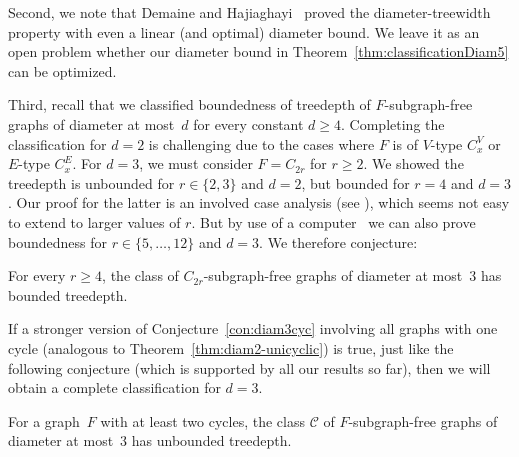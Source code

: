\documentclass[runningheads,envcountsame]{llncs}
\newcommand{\forbiddenGraph}{F}
\begin{document}
Second, we note that Demaine and Hajiaghayi~\cite{DH04} proved the diameter-treewidth property with even a linear (and optimal) diameter bound. We leave it as an open problem whether our diameter bound in Theorem~\ref{thm:classificationDiam5} can be optimized.

Third, recall that we classified boundedness of treedepth of $F$-subgraph-free graphs of diameter at most~$d$ for every constant $d\geq 4$. Completing the classification for $d=2$ is challenging due to the cases where $F$ is of $V$-type $C^V_x$ or $E$-type $C^E_x$. For $d=3$, we must consider $F=C_{2r}$ for $r\geq 2$. We showed the treedepth is unbounded for $r\in \{2,3\}$ and $d=2$, but bounded for $r=4$ and $d=3$. Our proof for the latter is an involved case analysis 
(see ),
which seems not easy to extend to larger values of $r$. But by use of a computer~\cite{Ea25} we can also prove boundedness for 
$r\in \{5,\ldots,12\}$ and $d=3$. We therefore conjecture: 
\begin{conjecture}\label{con:diam3cyc}
    For every $r\geq 4$, the class of $C_{2r}$-subgraph-free graphs of diameter at most~$3$ has bounded treedepth.
\end{conjecture}
If a stronger version of Conjecture~\ref{con:diam3cyc} involving all graphs with one cycle
(analogous to Theorem~\ref{thm:diam2-unicyclic}) is true, just like the following conjecture (which is supported by all our results so far), then we will obtain a complete classification for $d=3$.

\begin{conjecture}\label{con:diam3TwoCyc}
    For a graph~$\forbiddenGraph$ with at least two cycles, the class $\mathcal{C}$ of $\forbiddenGraph$-subgraph-free graphs of diameter at most~$3$ has unbounded treedepth.
\end{conjecture}


\end{document}
